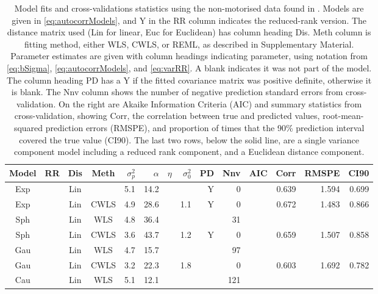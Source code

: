 \documentclass[11pt, titlepage]{article}\usepackage[]{graphicx}\usepackage[]{color}
\begin{document}
\begin{spacing}{1.9}
\begin{flushleft}
\newpage
\begin{table}[ht]
				\caption{Model fits and cross-validations statistics using the non-motorised data found in \citet{Ladl:Avga:Whea:Boyc:pred:2016}. Models are given in \ref{eq:autocorrModels}, and Y in the RR column indicates the reduced-rank version. The distance matrix used (Lin for linear, Euc for Euclidean) has column heading Dis. Meth column is fitting method, either WLS, CWLS, or REML, as described in Supplementary Material. Parameter estimates are given with column headings indicating parameter, using notation from \ref{eq:bSigma}, \ref{eq:autocorrModels}, and \ref{eq:varRR}.  A blank indicates it was not part of the model.  The column heading PD has a Y if the fitted covariance matrix was positive definite, otherwise it is blank.  The Nnv column shows the number of negative prediction standard errors from cross-validation.  On the right are Akaike Information Criteria (AIC) and summary statistics from cross-validation, showing Corr, the correlation between true and predicted values, root-mean-squared prediction errors (RMSPE), and proportion of times that the 90\% prediction interval covered the true value (CI90).  The last two rows, below the solid line, are a single variance component model including a reduced rank component, and a Euclidean distance component.  \label{Tab:CVstats}}
\begin{center}
\begin{tabular}{cc|cc|rrrr|rr|rrrr}
  \hline
  \hline
  Model & RR & Dis & Meth & $\sigma^2_p$ & $\alpha$ & $\eta$ & $\sigma^2_0$ & PD & Nnv & AIC & Corr & RMSPE & CI90 \\
	\hline
  \hline
Exp &  & Lin &   & 5.1 & 14.2 &  &  & Y & 0 &  & 0.639 & 1.594 & 0.699 \\ 
  Exp &  & Lin & CWLS & 4.9 & 28.6 &  & 1.1 & Y & 0 &  & 0.672 & 1.483 & 0.866 \\ 
  Sph &  & Lin & WLS & 4.8 & 36.4 &  &  &   & 31 &  &  &  &  \\ 
  Sph &  & Lin & CWLS & 3.6 & 43.7 &  & 1.2 & Y & 0 &  & 0.659 & 1.507 & 0.858 \\ 
  Gau &  & Lin & WLS & 4.7 & 15.7 &  &  &   & 97 &  &  &  &  \\ 
  Gau &  & Lin & CWLS & 3.2 & 22.3 &  & 1.8 &   & 0 &  & 0.603 & 1.692 & 0.782 \\ 
  Cau &  & Lin & WLS & 5.1 & 12.1 &  &  &   & 121 &  &  &  &  \\ 

\end{tabular}
\end{center}
\end{table}
\end{flushleft}
\end{spacing}
\end{document}
